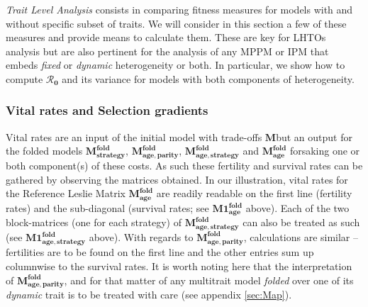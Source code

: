 \documentclass[10pt,a4paper]{article}
\newcommand{\M}{$\mathbf{M}$}
\newcommand{\Rzero}{$\boldsymbol{\mathcal{R}_{0}}$  }
\begin{document}
\emph{Trait Level Analysis} consists in comparing fitness measures for models with and without specific subset of traits. We will consider in this section a few of these measures and provide means to calculate them. These are key for LHTOs analysis but are also pertinent for the analysis of any MPPM or IPM that embeds \emph{fixed} or \emph{dynamic} heterogeneity or both. In particular, we show how to compute \Rzero and its variance for models with both components of heterogeneity.


\subsubsection{Vital rates and Selection gradients}
Vital rates are an input of the initial model with trade-offs \M but an output for the folded models $\mathbf{M^{fold}_{strategy}}$, $\mathbf{M^{fold}_{age,parity}}$, $\mathbf{M^{fold}_{age,strategy}}$ and $\mathbf{M^{fold}_{age}}$ 
forsaking one or both component(s) of these costs.  As such these fertility and survival rates can be gathered by observing the matrices obtained. In our illustration, vital rates for the Reference Leslie Matrix $\mathbf{M^{fold}_{age}}$ are readily readable on the first line (fertility rates) and the sub-diagonal (survival rates; see $\mathbf{M1^{fold}_{age}}$ above). Each of the two block-matrices (one for each strategy) of $\mathbf{M^{fold}_{age,strategy}}$ can also be treated as such (see $\mathbf{M1^{fold}_{age,strategy}}$ above). With regards to $\mathbf{M^{fold}_{age,parity}}$, calculations are similar – fertilities are to be found on the first line and the other entries sum up columnwise to the survival rates. It is worth noting here that the interpretation of $\mathbf{M^{fold}_{age,parity}}$, and for that matter of any multitrait model \emph{folded} over one of its \emph{dynamic} trait is to be treated with care (see appendix \ref{sec:Map}).\\
\end{document}
